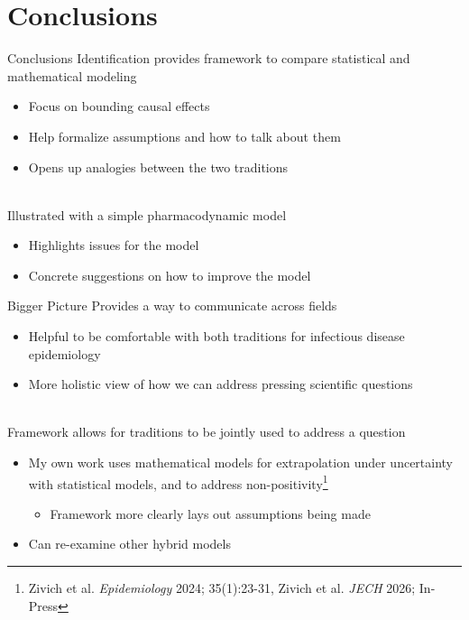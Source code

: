\documentclass[aspectratio=169]{beamer}
\begin{document}
\section{Conclusions}

\begin{frame}{Conclusions}
	Identification provides framework to compare statistical and mathematical modeling
	\begin{itemize}
		\item Focus on bounding causal effects
		\item Help formalize assumptions and how to talk about them
		\item Opens up analogies between the two traditions
	\end{itemize}
	~\\
	Illustrated with a simple pharmacodynamic model
	\begin{itemize}
		\item Highlights issues for the model
		\item Concrete suggestions on how to improve the model
	\end{itemize}
\end{frame}

\begin{frame}{Bigger Picture}
	Provides a way to communicate across fields
	\begin{itemize}
		\item Helpful to be comfortable with both traditions for infectious disease epidemiology
		\item More holistic view of how we can address pressing scientific questions
	\end{itemize}
	~\\
	Framework allows for traditions to be jointly used to address a question
	\begin{itemize}
		\item My own work uses mathematical models for extrapolation under uncertainty with statistical models, and to address non-positivity\footnote[frame]{Zivich et al. \textit{Epidemiology} 2024; 35(1):23-31, Zivich et al. \textit{JECH} 2026; In-Press}
		\begin{itemize}
			\item Framework more clearly lays out assumptions being made
		\end{itemize}
		\item Can re-examine other hybrid models
	\end{itemize} 
\end{frame}
\end{document}
